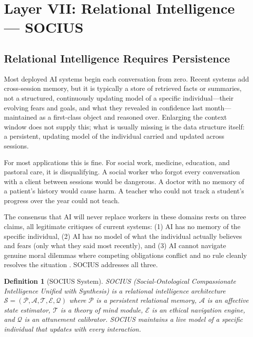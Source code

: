 \documentclass[12pt]{article}
\newtheorem{definition}{Definition}
\begin{document}
\section{Layer VII: Relational Intelligence --- SOCIUS}
\label{sec:socius}

\subsection{Relational Intelligence Requires Persistence}

Most deployed AI systems begin each conversation from zero. Recent systems add cross-session memory, but it is typically a store of retrieved facts or summaries, not a structured, continuously updating model of a specific individual---their evolving fears and goals, and what they revealed in confidence last month---maintained as a first-class object and reasoned over. Enlarging the context window does not supply this; what is usually missing is the data structure itself: a persistent, updating model of the individual carried and updated across sessions.

For most applications this is fine. For social work, medicine, education, and pastoral care, it is disqualifying. A social worker who forgot every conversation with a client between sessions would be dangerous. A doctor with no memory of a patient's history would cause harm. A teacher who could not track a student's progress over the year could not teach.

The consensus that AI will never replace workers in these domains rests on three claims, all legitimate critiques of current systems: (1) AI has no memory of the specific individual, (2) AI has no model of what the individual actually believes and fears (only what they said most recently), and (3) AI cannot navigate genuine moral dilemmas where competing obligations conflict and no rule cleanly resolves the situation \cite{beccue2024}. SOCIUS addresses all three.

\begin{definition}[SOCIUS System]
SOCIUS (Social-Ontological Compassionate Intelligence Unified with Synthesis) is a relational intelligence architecture $\mathcal{S} = (\mathcal{P}, \mathcal{A}, \mathcal{T}, \mathcal{E}, \mathcal{Q})$ where $\mathcal{P}$ is a persistent relational memory, $\mathcal{A}$ is an affective state estimator, $\mathcal{T}$ is a theory of mind module, $\mathcal{E}$ is an ethical navigation engine, and $\mathcal{Q}$ is an attunement calibrator. SOCIUS maintains a live model of a specific individual that updates with every interaction.
\end{definition}
\end{document}
